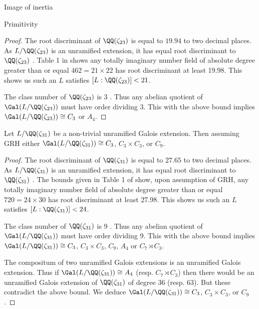 \documentclass[11pt,a4paper]{article}
\begin{document}
\begin{section}{Image of inertia}
\begin{subsection}{Primitivity}
\begin{proof}
The root discriminant of $\QQ(\zeta_{23})$ is equal to $19.94$ to two decimal places.
As $L/\QQ(\zeta_{23})$ is an unramified extension, it has equal root discriminant to $\QQ(\zeta_{23})$ \cite[Lemma 11.22]{washington}.
 Table 1 in \cite{DiazyDiazTables} shows any totally imaginary number field of absolute degree greater than or equal $462 = 21\times 22$ has root discriminant at least 19.98.
 This shows us such an $L$ satisfies $[L:\QQ(\zeta_{23})] < 21$.

The class number of $\QQ(\zeta_{23})$ is 3 \cite[Tables, \S 3]{washington}. Thus any abelian quotient of $\Gal(L/\QQ(\zeta_{23}))$ must have order dividing 3.
This with the above bound implies $\Gal(L/\QQ(\zeta_{23})) \cong C_3$ or $A_4$.
\end{proof}


\begin{lemma}
\label{lemma_primitivity_unramified_extns_of_31}
Let $L/\QQ(\zeta_{31})$ be a non-trivial unramified Galois extension. Then assuming GRH either $\Gal(L/\QQ(\zeta_{31})) \cong C_3$, $C_3 \times C_3$, or $C_9$.
\end{lemma}

\begin{proof}
The root discriminant of $\QQ(\zeta_{31})$ is equal to $27.65$ to two decimal places.
As $L/\QQ(\zeta_{31})$ is an unramified extension, it has equal root discriminant to $\QQ(\zeta_{31})$ \cite[Lemma 11.22]{washington}.
 The bounds given in Table 1 of \cite{Odlyzko_bounds} show, upon assumption of GRH, any totally imaginary number field of absolute degree greater than or equal $720 = 24\times 30$ has root discriminant at least 27.98.
 This shows us such an $L$ satisfies $[L:\QQ(\zeta_{31})] < 24$.

The class number of $\QQ(\zeta_{31})$ is 9 \cite[Tables, \S 3]{washington}. Thus any abelian quotient of $\Gal(L/\QQ(\zeta_{31}))$ must have order dividing 9.
This with the above bound implies $\Gal(L/\QQ(\zeta_{31})) \cong C_3$, $C_3\times C_3$, $C_9$, $A_4$ or $C_7 \rtimes C_3$.

The compositum of two unramified Galois extensions is an unramified Galois extension.
Thus if $\Gal(L/\QQ(\zeta_{31})) \cong A_4$ (resp. $C_7 \rtimes C_3$) then there would be an unramified Galois extension of $\QQ(\zeta_{31})$ of degree $36$ (resp. $63$). But these contradict the above bound.
We deduce $\Gal(L/\QQ(\zeta_{31})) \cong C_3$, $C_3\times C_3$, or $C_9$.
\end{proof}



\end{subsection}
\end{section}
\end{document}
